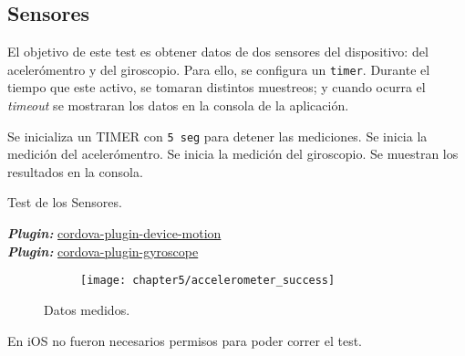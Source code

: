 \subsection{Sensores}
El objetivo de este test es obtener datos de dos sensores del dispositivo: del acelerómentro y del giroscopio. Para ello, se configura un \texttt{timer}. Durante el tiempo que este activo, se tomaran distintos muestreos; y cuando ocurra el \emph{timeout} se mostraran los datos en la consola de la aplicación.\\
\begin{algorithm}
	\begin{algorithmic}[1]
		\STATE Se inicializa un TIMER con \texttt{5 seg} para detener las mediciones.
		\STATE Se inicia la medición del acelerómentro.
		\STATE Se inicia la medición del giroscopio.
		\STATE Se muestran los resultados en la consola.
	\end{algorithmic}
	\caption{Test de los Sensores.}\label{alg:chap5_test_sensors}
\end{algorithm}
\textbf{\emph{Plugin:}} \href{https://www.npmjs.com/package/cordova-plugin-device-motion}{cordova-plugin-device-motion}\\
\textbf{\emph{Plugin:}} \href{https://www.npmjs.com/package/cordova-plugin-gyroscope}{cordova-plugin-gyroscope}\\
\begin{figure}[hbtp]
    \centering
	\begin{subfigure}{.3\linewidth}
	    \centering
		\texttt{[image: chapter5/accelerometer\_success]}
		\label{fig:ch05:accelerometer_success}
	\end{subfigure}
	\caption{Datos medidos.}
	\label{fig:chapter05:sensors_test}
\end{figure}
En iOS no fueron necesarios permisos para poder correr el test.
\newpage
